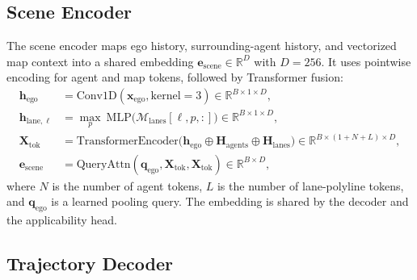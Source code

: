 \subsection{Scene Encoder}
\label{subsec:scene_encoder}

The scene encoder maps ego history, surrounding-agent history, and vectorized map context into a shared embedding $\mathbf{e}_{\text{scene}}\in\mathbb{R}^{D}$ with $D{=}256$. It uses pointwise encoding for agent and map tokens, followed by Transformer fusion:
\begin{align}
\mathbf{h}_{\text{ego}} &= \text{Conv1D}(\mathbf{x}_{\text{ego}}, \text{kernel}=3) \in \mathbb{R}^{B\times 1\times D}, \\
\mathbf{h}_{\text{lane},\ell} &= \max_{p}\ \text{MLP}\big(\mathcal{M}_{\text{lanes}}[\ell,p,:]\big) \in \mathbb{R}^{B\times 1\times D}, \\
\mathbf{X}_{\text{tok}} &= \text{TransformerEncoder}\big(\mathbf{h}_{\text{ego}} \oplus
\mathbf{H}_{\text{agents}} \oplus \mathbf{H}_{\text{lanes}}\big) \in \mathbb{R}^{B\times (1+N+L)\times D}, \\
\mathbf{e}_{\text{scene}} &= \text{QueryAttn}(\mathbf{q}_{\text{ego}}, \mathbf{X}_{\text{tok}}, \mathbf{X}_{\text{tok}}) \in \mathbb{R}^{B\times D},
\end{align}
where $N$ is the number of agent tokens, $L$ is the number of lane-polyline tokens, and $\mathbf{q}_{\text{ego}}$ is a learned pooling query. The embedding is shared by the decoder and the applicability head.

\subsection{Trajectory Decoder}
\label{subsec:trajectory_decoder}

